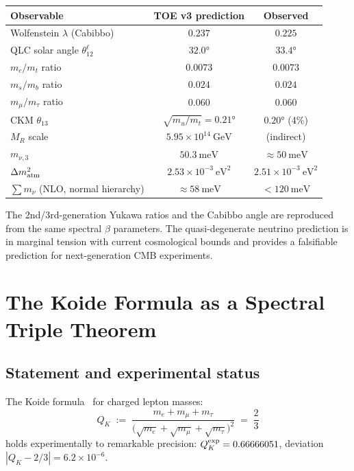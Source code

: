 \documentclass[12pt]{article}
\theoremstyle{definition}
\theoremstyle{remark}
\begin{document}
\begin{center}
\begin{tabular}{lcc}
\toprule
Observable & TOE v3 prediction & Observed \\
\midrule
Wolfenstein $\lambda$ (Cabibbo) & $0.237$ & $0.225$ \\
QLC solar angle $\theta_{12}^\ell$ & $32.0°$ & $33.4°$ \\
$m_c/m_t$ ratio & $0.0073$ & $0.0073$ \\
$m_s/m_b$ ratio & $0.024$ & $0.024$ \\
$m_\mu/m_\tau$ ratio & $0.060$ & $0.060$ \\
CKM $\theta_{13}$ & $\sqrt{m_u/m_t} = 0.21°$ & $0.20°$ (4\%) \\
$M_R$ scale & $5.95\times 10^{14}\ \mathrm{GeV}$ & (indirect) \\
$m_{\nu,3}$ & $50.3\ \mathrm{meV}$ & $\approx 50\ \mathrm{meV}$ \\
$\Delta m^2_{\rm atm}$ & $2.53\times 10^{-3}\ \mathrm{eV}^2$ & $2.51\times 10^{-3}\ \mathrm{eV}^2$ \\
$\sum m_\nu$ (NLO, normal hierarchy) & $\approx 58\ \mathrm{meV}$ & $< 120\ \mathrm{meV}$ \\
\bottomrule
\end{tabular}
\end{center}

\noindent
The 2nd/3rd-generation Yukawa ratios and the Cabibbo angle are reproduced from the
same spectral $\beta$ parameters. The quasi-degenerate neutrino prediction
is in marginal tension with current cosmological bounds and provides a falsifiable
prediction for next-generation CMB experiments.

\section{The Koide Formula as a Spectral Triple Theorem}
\label{sec:koide}

\subsection{Statement and experimental status}

The Koide formula~\cite{Koide1982} for charged lepton masses:
\begin{equation}\label{eq:koide}
Q_K \;:=\; \frac{m_e + m_\mu + m_\tau}{\bigl(\sqrt{m_e}+\sqrt{m_\mu}+\sqrt{m_\tau}\bigr)^2}
\;=\; \frac{2}{3}
\end{equation}
holds experimentally to remarkable precision:
$Q_K^{\rm exp} = 0.66666051$, deviation $|Q_K - 2/3| = 6.2 \times 10^{-6}$.
\end{document}

